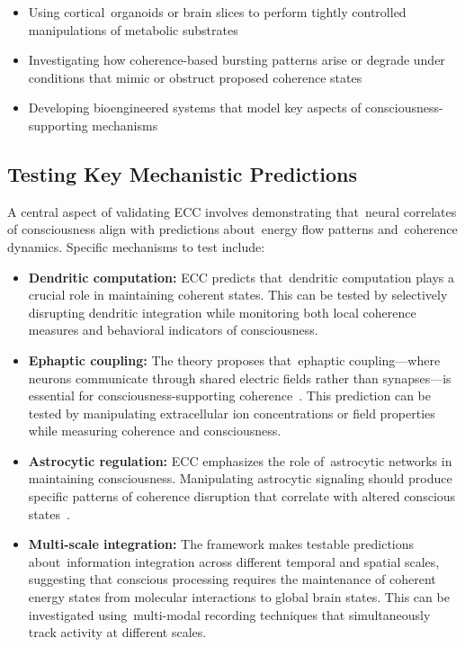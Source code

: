 \begin{itemize}
    \item Using cortical~organoids or brain slices to perform tightly controlled manipulations of metabolic substrates~\cite{Lancaster2013, TangSchomer2014}
    
    \item Investigating how coherence-based bursting patterns arise or degrade under conditions that mimic or obstruct proposed coherence states
    
    \item Developing bioengineered systems that model key aspects of consciousness-supporting mechanisms
\end{itemize}

\subsection*{Testing Key Mechanistic Predictions}

A central aspect of validating ECC involves demonstrating that~neural correlates of consciousness align with predictions about~energy flow patterns and~coherence dynamics. Specific mechanisms to test include:

\begin{itemize}
    \item \textbf{Dendritic computation:} ECC predicts that~dendritic computation plays a crucial role in maintaining coherent states. This can be tested by selectively disrupting dendritic integration while monitoring both local coherence measures and behavioral indicators of consciousness.
    
    \item \textbf{Ephaptic coupling:} The theory proposes that~ephaptic coupling—where neurons communicate through shared electric fields rather than synapses—is essential for consciousness-supporting coherence~\cite{anastassiou2015ephaptic}. This prediction can be tested by manipulating extracellular ion concentrations or field properties while measuring coherence and consciousness.
    
    \item \textbf{Astrocytic regulation:} ECC emphasizes the role of~astrocytic networks in maintaining consciousness. Manipulating astrocytic signaling should produce specific patterns of coherence disruption that correlate with altered conscious states~\cite{Poskanzer2016}.
    
    \item \textbf{Multi-scale integration:} The framework makes testable predictions about~information integration across different temporal and spatial scales, suggesting that conscious processing requires the maintenance of coherent energy states from molecular interactions to global brain states. This can be investigated using~multi-modal recording techniques that simultaneously track activity at different scales.
\end{itemize}

